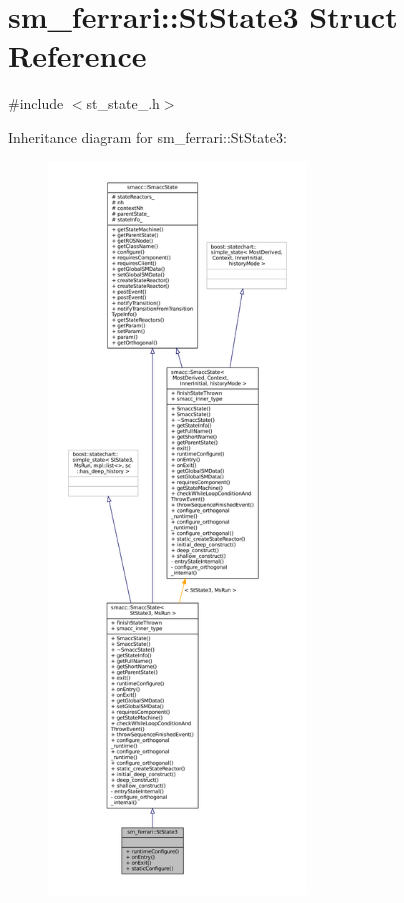 \hypertarget{structsm__ferrari_1_1StState3}{}\section{sm\+\_\+ferrari\+:\+:St\+State3 Struct Reference}
\label{structsm__ferrari_1_1StState3}


{\ttfamily \#include $<$st\+\_\+state\+\_.\+h$>$}



Inheritance diagram for sm\+\_\+ferrari\+:\+:St\+State3\+:
\nopagebreak
\begin{figure}[H]
\begin{center}
\leavevmode
\includegraphics[height=550pt]{structsm__ferrari_1_1StState3__inherit__graph}
\end{center}
\end{figure}


